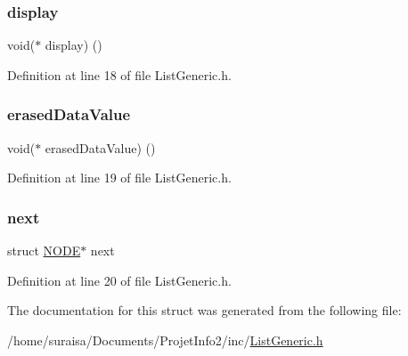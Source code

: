 \subsubsection{\texorpdfstring{display}{display}}
{\footnotesize\ttfamily void($\ast$ display) ()}



Definition at line 18 of file List\+Generic.\+h.

\mbox{\label{struct_n_o_d_e_af74860f29ae9aa4b463e2378bcd7a298}} 
\subsubsection{\texorpdfstring{erased\+Data\+Value}{erasedDataValue}}
{\footnotesize\ttfamily void($\ast$ erased\+Data\+Value) ()}



Definition at line 19 of file List\+Generic.\+h.

\mbox{\label{struct_n_o_d_e_aab1da0ec3c3507ad0a648c72f34b3267}} 
\subsubsection{\texorpdfstring{next}{next}}
{\footnotesize\ttfamily struct \hyperlink{struct_n_o_d_e}{N\+O\+DE}$\ast$ next}



Definition at line 20 of file List\+Generic.\+h.



The documentation for this struct was generated from the following file\+:\begin{DoxyCompactItemize}
\item 
/home/suraisa/\+Documents/\+Projet\+Info2/inc/\hyperlink{_list_generic_8h}{List\+Generic.\+h}\end{DoxyCompactItemize}
